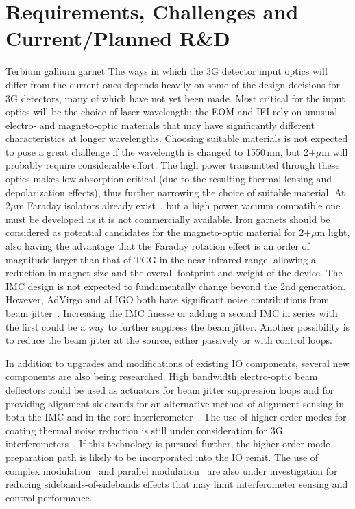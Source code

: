 \section{Requirements, Challenges and Current/Planned R\&D }
Terbium gallium garnet The ways in which the \ac{3G}   detector input optics will differ from the current ones depends heavily on some of the design decisions for \ac{3G}   detectors, many of which have not yet been made. Most critical for the input optics will be the choice of laser wavelength; the \ac{EOM} and \ac{IFI} rely on unusual electro- and magneto-optic materials that may have significantly different characteristics at longer wavelengths. Choosing suitable materials is not expected to pose a great challenge if the wavelength is changed to 1550\,nm, but 2+$\mu$m will probably require considerable effort. The high power transmitted through these optics makes low absorption critical (due to the resulting thermal lensing and depolarization effects), thus further narrowing the choice of suitable material. At 2$\mu$m Faraday isolators already exist~\cite{EOTFI}, but a high power vacuum compatible one must be developed as it is not commercially available. Iron garnets should be considered as potential candidates for the magneto-optic material for 2+$\mu$m light, also having the advantage that the Faraday rotation effect is an order of magnitude larger than that of \ac{TGG}  in the near infrared range, allowing a reduction in magnet size and the overall footprint and weight of the device.
The \ac{IMC} design is not expected to fundamentally change beyond the 2nd generation.  However, AdVirgo and \ac{aLIGO}  both have significant noise contributions from beam jitter~\cite{aLIGOjitter,adVirgojitter}. Increasing the \ac{IMC} finesse or adding a second \ac{IMC} in series with the first could be a way to further suppress the beam jitter. Another possibility is to reduce the beam jitter at the source, either passively or with 
control loops.  

In addition to upgrades and modifications of existing IO components, several new components are also being researched. High bandwidth electro-optic beam deflectors could be used as actuators for beam jitter suppression loops and for providing alignment sidebands for an alternative method of alignment sensing in both the \ac{IMC} and in the core interferometer~\cite{RFJASC}. The use of higher-order modes for coating thermal noise reduction is still under consideration for \ac{3G}   interferometers~\cite{LGmodes}. If this technology is pursued further, the higher-order mode preparation path is likely to be incorporated into the IO remit. The use of complex modulation~\cite{complexmod} and parallel modulation~\cite{kagraMZI} are also under investigation for reducing sidebands-of-sidebands effects that may limit interferometer sensing and control performance.

